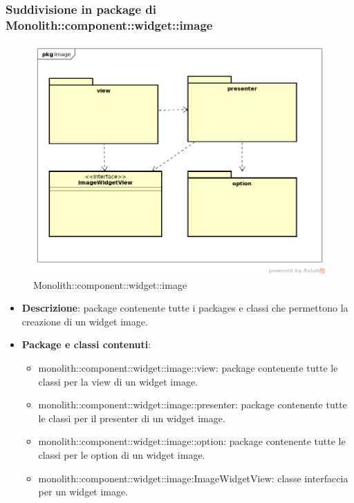 \subsubsection{Suddivisione in package  di Monolith::component::widget::image}
\label{Monolith::component::widget::image}
\begin{figure}[H]
	\centering
	\includegraphics[scale=0.5]{Sezioni/imgPackage/component_widget_image.png}
	\caption{Monolith::component::widget::image}
\end{figure}
\begin{itemize}
	\item{\textbf{Descrizione}}: package contenente tutte i packages e classi che permettono la creazione di un widget image.
	\item{\textbf{Package e classi contenuti}}:
	\begin{itemize}
	\item{monolith::component::widget::image::view}: package contenente tutte le classi per la view di un widget image.
	\item{monolith::component::widget::image::presenter}: package contenente tutte le classi per il presenter di un widget image.
	\item{monolith::component::widget::image::option}: package contenente tutte le classi per le option di un widget image.
	\item{monolith::component::widget::image:ImageWidgetView}: classe interfaccia per un widget image.
	\end{itemize}
	
\end{itemize}


